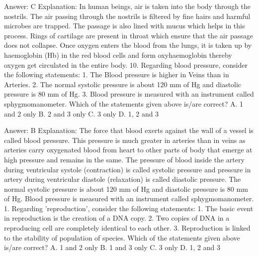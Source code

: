 Answer: C
Explanation: In human beings, air is taken into the body through the nostrils. The air passing through the nostrils is filtered by fine hairs and harmful microbes are trapped. The passage is also lined with mucus which helps in this process. Rings of cartilage are present in throat which ensure that the air passage does not collapse. Once oxygen enters the blood from the lungs, it is taken up by haemoglobin (Hb) in the red blood cells and form oxyhaemoglobin thereby oxygen get circulated in the entire body. 10. Regarding blood pressure, consider the following statements: 1. The Blood pressure is higher in Veins than in Arteries. 2. The normal systolic pressure is about 120 mm of Hg and diastolic pressure is 80 mm of Hg. 3. Blood pressure is measured with an instrument called sphygmomanometer. Which of the statements given above is/are correct? A. 1 and 2 only B. 2 and 3 only C. 3 only D. 1, 2 and 3 

Answer: B
Explanation: The force that blood exerts against the wall of a vessel is called blood pressure. This pressure is much greater in arteries than in veins as arteries carry oxygenated blood from heart to other parts of body that emerge at high pressure and remains in the same. The pressure of blood inside the artery during ventricular systole (contraction) is called systolic pressure and pressure in artery during ventricular diastole (relaxation) is called diastolic pressure. The normal systolic pressure is about 120 mm of Hg and diastolic pressure is 80 mm of Hg. Blood pressure is measured with an instrument called sphygmomanometer. 1. Regarding 'reproduction', consider the following statements: 1. The basic event in reproduction is the creation of a DNA copy. 2. Two copies of DNA in a reproducing cell are completely identical to each other. 3. Reproduction is linked to the stability of population of species. Which of the statements given above is/are correct? A. 1 and 2 only B. 1 and 3 only C. 3 only D. 1, 2 and 3 

